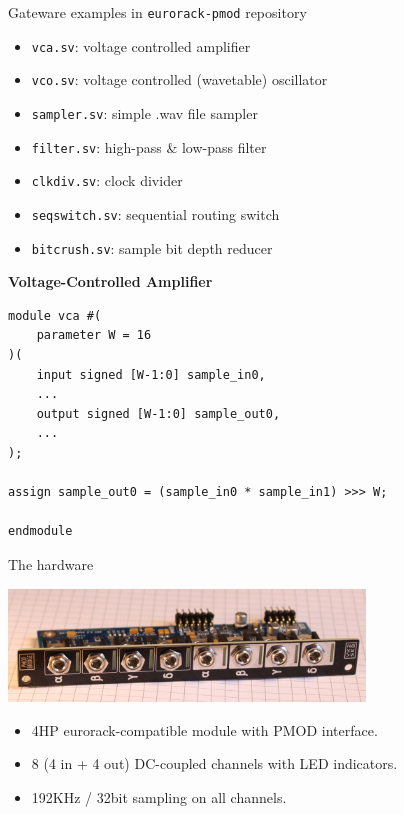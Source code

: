 \documentclass{beamer}
\begin{document}
\begin{frame}{Gateware examples in \texttt{eurorack-pmod} repository}

    \begin{itemize}
        \item \texttt{vca.sv}: voltage controlled amplifier
        \item \texttt{vco.sv}: voltage controlled (wavetable) oscillator
        \item \texttt{sampler.sv}: simple .wav file sampler
        \item \texttt{filter.sv}: high-pass \& low-pass filter
        \item \texttt{clkdiv.sv}: clock divider
        \item \texttt{seqswitch.sv}: sequential routing switch
        \item \texttt{bitcrush.sv}: sample bit depth reducer
    \end{itemize}

\end{frame}

\begin{frame}[fragile]

    \textbf{Voltage-Controlled Amplifier}

    \begin{verbatim}
module vca #(
    parameter W = 16
)(
    input signed [W-1:0] sample_in0,
    ...
    output signed [W-1:0] sample_out0,
    ...
);

assign sample_out0 = (sample_in0 * sample_in1) >>> W;

endmodule
    \end{verbatim}

\end{frame}

\begin{frame}{The hardware}


    \begin{center}
        \includegraphics[height=3cm]{img/eurorack-pmod.jpg}
    \end{center}

    \begin{itemize}
        \item 4HP eurorack-compatible module with PMOD interface.
        \item 8 (4 in + 4 out) DC-coupled channels with LED indicators.
        \item 192KHz / 32bit sampling on all channels.
    \end{itemize}

\end{frame}
\end{document}
